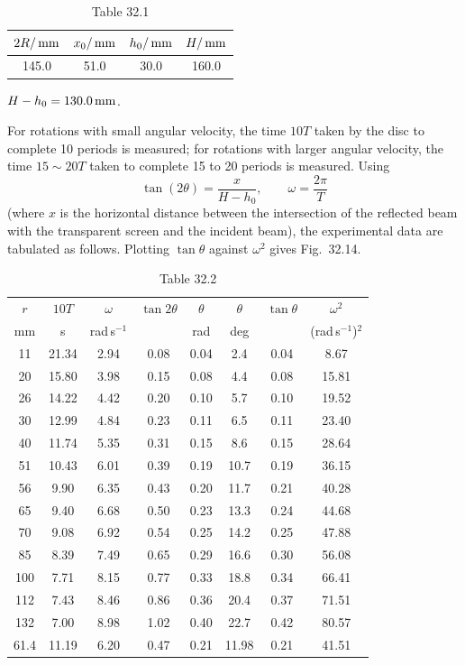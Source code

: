 \begin{table}[h]
\centering
\small
\caption*{Table 32.1}
\begin{tabular}{|c|c|c|c|}
\hline
$2R/\,\mathrm{mm}$ & $x_0/\,\mathrm{mm}$ & $h_0/\,\mathrm{mm}$ & $H/\,\mathrm{mm}$\\
\hline
145.0 & 51.0 & 30.0 & 160.0\\
\hline
\end{tabular}
\end{table}

\noindent$H-h_0=130.0\,\mathrm{mm}$.

For rotations with small angular velocity, the time $10T$ taken by the disc to complete 10 periods is measured; for rotations with larger angular velocity, the time $15\sim20T$ taken to complete 15 to 20 periods is measured. Using
\[
\tan(2\theta)=\frac{x}{H-h_0},\qquad \omega=\frac{2\pi}{T}
\]
(where $x$ is the horizontal distance between the intersection of the reflected beam with the transparent screen and the incident beam), the experimental data are tabulated as follows. Plotting $\tan\theta$ against $\omega^2$ gives Fig.~32.14.

\begin{table}[h]
\centering
\scriptsize
\caption*{Table 32.2}
\setlength{\tabcolsep}{3.5pt}
\begin{tabular}{|c|c|c|c|c|c|c|c|}
\hline
$r$ & $10T$ & $\omega$ & $\tan2\theta$ & $\theta$ & $\theta$ & $\tan\theta$ & $\omega^2$\\
\scriptsize mm & \scriptsize s & \scriptsize rad\,s$^{-1}$ & & \scriptsize rad & \scriptsize deg & & \scriptsize (rad\,s$^{-1}$)$^2$\\
\hline
11 & 21.34 & 2.94 & 0.08 & 0.04 & 2.4 & 0.04 & 8.67\\
20 & 15.80 & 3.98 & 0.15 & 0.08 & 4.4 & 0.08 & 15.81\\
26 & 14.22 & 4.42 & 0.20 & 0.10 & 5.7 & 0.10 & 19.52\\
30 & 12.99 & 4.84 & 0.23 & 0.11 & 6.5 & 0.11 & 23.40\\
40 & 11.74 & 5.35 & 0.31 & 0.15 & 8.6 & 0.15 & 28.64\\
51 & 10.43 & 6.01 & 0.39 & 0.19 & 10.7 & 0.19 & 36.15\\
56 & 9.90 & 6.35 & 0.43 & 0.20 & 11.7 & 0.21 & 40.28\\
65 & 9.40 & 6.68 & 0.50 & 0.23 & 13.3 & 0.24 & 44.68\\
70 & 9.08 & 6.92 & 0.54 & 0.25 & 14.2 & 0.25 & 47.88\\
85 & 8.39 & 7.49 & 0.65 & 0.29 & 16.6 & 0.30 & 56.08\\
100 & 7.71 & 8.15 & 0.77 & 0.33 & 18.8 & 0.34 & 66.41\\
112 & 7.43 & 8.46 & 0.86 & 0.36 & 20.4 & 0.37 & 71.51\\
132 & 7.00 & 8.98 & 1.02 & 0.40 & 22.7 & 0.42 & 80.57\\
\hline
61.4 & 11.19 & 6.20 & 0.47 & 0.21 & 11.98 & 0.21 & 41.51\\
\hline
\end{tabular}
\end{table}

